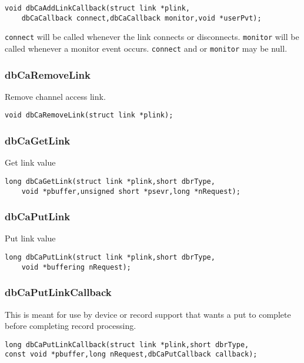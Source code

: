 \begin{verbatim}
void dbCaAddLinkCallback(struct link *plink,
    dbCaCallback connect,dbCaCallback monitor,void *userPvt);
\end{verbatim}

\verb|connect| will be called whenever the link connects or disconnects. \verb|monitor| will be called whenever a monitor event 
occurs. \verb|connect| and or \verb|monitor| may be null.

\subsubsection{dbCaRemoveLink}

Remove channel access link.

\begin{verbatim}
void dbCaRemoveLink(struct link *plink);
\end{verbatim}

\subsubsection{dbCaGetLink}

Get link value

\begin{verbatim}
long dbCaGetLink(struct link *plink,short dbrType,
    void *pbuffer,unsigned short *psevr,long *nRequest);
\end{verbatim}

\subsubsection{dbCaPutLink}

Put link value

\begin{verbatim}
long dbCaPutLink(struct link *plink,short dbrType,
    void *buffering nRequest);
\end{verbatim}

\subsubsection{dbCaPutLinkCallback}

This is meant for use by device or record support that wants a put to complete before completing record processing.

\begin{verbatim}
long dbCaPutLinkCallback(struct link *plink,short dbrType,
const void *pbuffer,long nRequest,dbCaPutCallback callback);
\end{verbatim}


